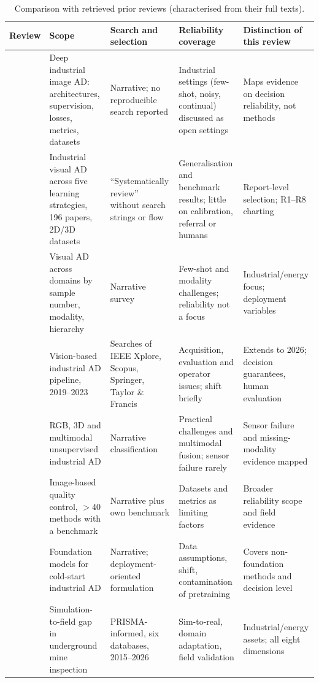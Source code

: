 \documentclass[journal]{IEEEtran}
\begin{document}
\begin{table}[t]
\caption{Comparison with retrieved prior reviews (characterised from their full texts).}
\label{tab:prior-reviews}
\centering\footnotesize
\begin{tabularx}{\textwidth}{p{}YYYY}
\toprule
Review & Scope & Search and selection & Reliability coverage & Distinction of this review \\
\midrule
\cite{liu2024deep} & Deep industrial image AD: architectures, supervision, losses, metrics, datasets & Narrative; no reproducible search reported & Industrial settings (few-shot, noisy, continual) discussed as open settings & Maps evidence on decision reliability, not methods \\
\cite{li2025survey} & Industrial visual AD across five learning strategies, 196 papers, 2D/3D datasets & ``Systematically review'' without search strings or flow & Generalisation and benchmark results; little on calibration, referral or humans & Report-level selection; R1--R8 charting \\
\cite{cao2024survey} & Visual AD across domains by sample number, modality, hierarchy & Narrative survey & Few-shot and modality challenges; reliability not a focus & Industrial/energy focus; deployment variables \\
\cite{alzarooni2025anomaly} & Vision-based industrial AD pipeline, 2019--2023 & Searches of IEEE Xplore, Scopus, Springer, Taylor \& Francis & Acquisition, evaluation and operator issues; shift briefly & Extends to 2026; decision guarantees, human evaluation \\
\cite{lin2025survey} & RGB, 3D and multimodal unsupervised industrial AD & Narrative classification & Practical challenges and multimodal fusion; sensor failure rarely & Sensor failure and missing-modality evidence mapped \\
\cite{diers2023survey} & Image-based quality control, $>$40 methods with a benchmark & Narrative plus own benchmark & Datasets and metrics as limiting factors & Broader reliability scope and field evidence \\
\cite{tan2026foundation} & Foundation models for cold-start industrial AD & Narrative; deployment-oriented formulation & Data assumptions, shift, contamination of pretraining & Covers non-foundation methods and decision level \\
\cite{zambuk2026bridging} & Simulation-to-field gap in underground mine inspection & PRISMA-informed, six databases, 2015--2026 & Sim-to-real, domain adaptation, field validation & Industrial/energy assets; all eight dimensions \\
\bottomrule
\end{tabularx}
\end{table}
\end{document}
